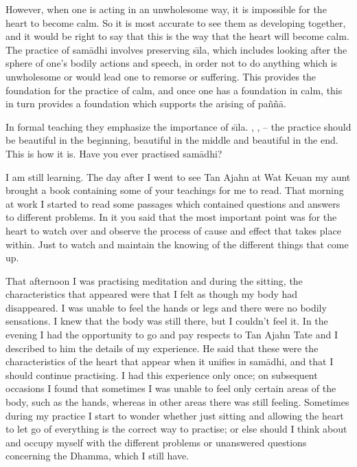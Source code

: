 However, when one is acting in an unwholesome way, it is impossible for the heart to become calm. So it is most accurate to see them as developing together, and it would be right to say that this is the way that the heart will become calm. The practice of sam\=adhi involves preserving s\={\i}la, which includes looking after the sphere of one's bodily actions and speech, in order not to do anything which is unwholesome or would lead one to remorse or suffering. This provides the foundation for the practice of calm, and once one has a foundation in calm, this in turn provides a foundation which supports the arising of pa\~n\~n\=a.

In formal teaching they emphasize the importance of s\={\i}la. ,     ,  -- the practice should be beautiful in the beginning, beautiful in the middle and beautiful in the end. This is how it is. Have you ever practised sam\=adhi?  

 I am still learning. The day after I went to see Tan Ajahn at Wat Keuan my aunt brought a book containing some of your teachings for me to read. That morning at work I started to read some passages which contained questions and answers to different problems. In it you said that the most important point was for the heart to watch over and observe the process of cause and effect that takes place within. Just to watch and maintain the knowing of the different things that come up.

That afternoon I was practising meditation and during the sitting, the characteristics that appeared were that I felt as though my body had disappeared. I was unable to feel the hands or legs and there were no bodily sensations. I knew that the body was still there, but I couldn't feel it. In the evening I had the opportunity to go and pay respects to Tan Ajahn Tate and I described to him the details of my experience. He said that these were the characteristics of the heart that appear when it unifies in sam\=adhi, and that I should continue practising. I had this experience only once; on subsequent occasions I found that sometimes I was unable to feel only certain areas of the body, such as the hands, whereas in other areas there was still feeling. Sometimes during my practice I start to wonder whether just sitting and allowing the heart to let go of everything is the correct way to practise; or else should I think about and occupy myself with the different problems or unanswered questions concerning the Dhamma, which I still have.  

